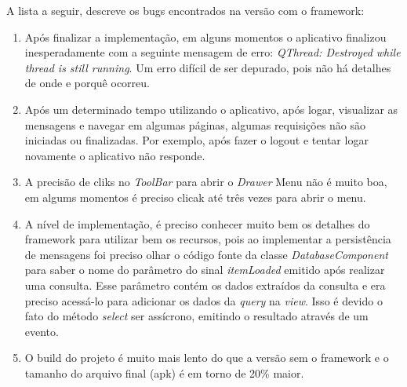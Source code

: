 A lista a seguir, descreve os bugs encontrados na versão com o framework:

\begin{enumerate}
	\item Após finalizar a implementação, em alguns momentos o aplicativo finalizou inesperadamente com a seguinte mensagem de erro: \textit{QThread: Destroyed while thread is still running}. Um erro difícil de ser depurado, pois não há detalhes de onde e porquê ocorreu.

	\item Após um determinado tempo utilizando o aplicativo, após logar, visualizar as mensagens e navegar em algumas páginas, algumas requisições não são iniciadas ou finalizadas. Por exemplo, após fazer o logout e tentar logar novamente o aplicativo não responde.

	\item A precisão de cliks no \textit{ToolBar} para abrir o \textit{Drawer} Menu não é muito boa, em algums momentos é preciso clicak até três vezes para abrir o menu.

	\item A nível de implementação, é preciso conhecer muito bem os detalhes do framework para utilizar bem os recursos, pois ao implementar a persistência de mensagens foi preciso olhar o código fonte da classe \textit{DatabaseComponent} para saber o nome do parâmetro do sinal \textit{itemLoaded} emitido após realizar uma consulta. Esse parâmetro contém os dados extraídos da consulta e era preciso acessá-lo para adicionar os dados da \textit{query} na \textit{view}. Isso é devido o fato do método \textit{select} ser assícrono, emitindo o resultado através de um evento.

	\item O build do projeto é muito mais lento do que a versão sem o framework e o tamanho do arquivo final (apk) é em torno de 20\% maior.
\end{enumerate}